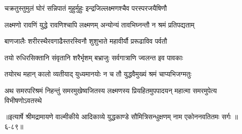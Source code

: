 \twolineshloka
{चक्रतुस्तुमुलं घोरं सन्निपातं मुहुर्मुहुः}
{इन्द्रजिल्लक्ष्मणश्चैव परस्परजयैषिणौ} %

\twolineshloka
{लक्ष्मणो रावणिं युद्धे रावणिश्चापि लक्ष्मणम्}
{अन्योन्यं तावभिघ्नन्तौ न श्रमं प्रतिपद्यताम्} %

\twolineshloka
{बाणजालैः शरीरस्थैरवगाढैस्तरस्विनौ}
{शुशुभाते महावीर्यौ प्ररूढाविव पर्वतौ} %

\twolineshloka
{तयो रुधिरसिक्तानि संवृतानि शरैर्भृशम्}
{बभ्राजुः सर्वगात्राणि ज्वलन्त इव पावकाः} %

\twolineshloka
{तयोरथ महान् कालो व्यतीयाद् युध्यमानयोः}
{न च तौ युद्धवैमुख्यं श्रमं चाप्यभिजग्मतुः} %

\twolineshloka
{अथ समरपरिश्रमं निहन्तुं समरमुखेष्वजितस्य लक्ष्मणस्य}
{प्रियहितमुपपादयन् महात्मा समरमुपेत्य विभीषणोऽवतस्थे} %


॥इत्यार्षे श्रीमद्रामायणे वाल्मीकीये आदिकाव्ये युद्धकाण्डे सौमित्रिसन्धुक्षणम् नाम एकोननवतितमः सर्गः ॥६-८९॥
